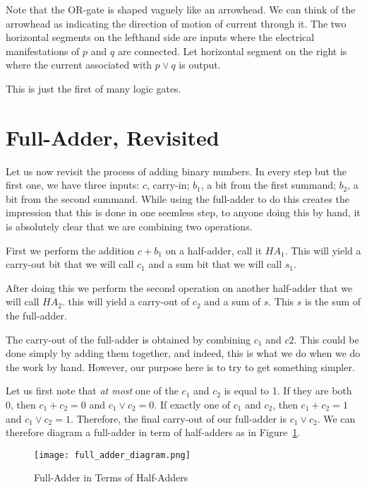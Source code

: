 Note that the OR-gate is shaped vaguely like an arrowhead.  We can think of the arrowhead as indicating the direction of motion of current through it.  The two horizontal segments on the lefthand side are inputs where the electrical manifestations of $p$ and $q$ are connected.  Let horizontal segment on the right is where the current associated with $p\vee  q$ is output.  

This is just the first of many logic gates.


\section{Full-Adder, Revisited}
Let us now revisit the process of adding binary numbers.  In every step but the first one, we have three inputs: $c$, carry-in; $b_1$, a bit from the first summand; $b_2$, a bit from the second summand.  While using the full-adder to do this creates the impression that this is done in one seemless step, to anyone doing this by hand, it is absolutely clear that we are combining two operations.

First we perform the addition $c + b_1$ on a half-adder, call it $HA_1$. This will yield a carry-out bit that we will call $c_1$ and a sum bit that we will call $s_1$.

After doing this we perform the second operation on another half-adder that we will call $HA_2$.  this will yield a carry-out of $c_2$ and a sum of $s$.  This $s$ is the sum of the full-adder.

The carry-out of the full-adder is obtained by combining $c_1$ and $c2$.  This could be done simply by adding them together, and indeed, this is what we do when we do the work by hand.  However, our purpose here is to try to get something simpler.

Let us first note that \emph{at most} one of the $c_1$ and $c_2$ is equal to 1.  If they are both 0, then $c_1 + c_2 = 0$ and $c_1 \vee  c_2 =0$.  If exactly one of $c_1$ and $c_2$, then $c_1+c_2 = 1$ and $c_1 \vee  c_2 = 1$. Therefore, the final carry-out of our full-adder is $c_1\vee c_2$.  We can therefore diagram a full-adder in term of half-adders as in Figure~\ref{figure:full-adder_in_terms_of_half_adders}.
\begin{figure}
		\begin{center}
		\texttt{[image: full\_adder\_diagram.png]}
	\end{center}
\caption{Full-Adder in Terms of Half-Adders}\label{figure:full-adder_in_terms_of_half_adders}
\end{figure}

